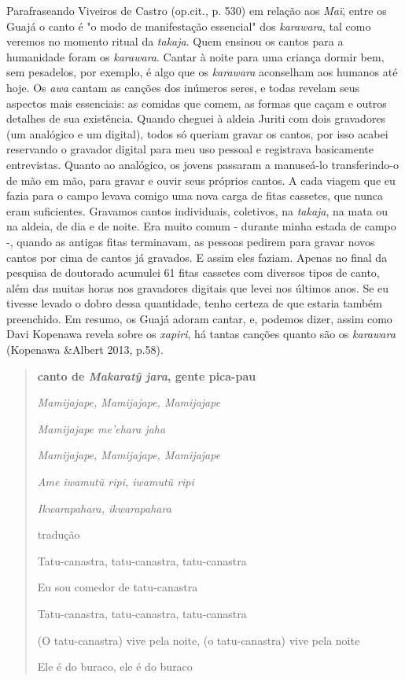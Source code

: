 Parafraseando Viveiros de Castro (op.cit., p. 530) em relação aos
\emph{Maï}, entre os Guajá o canto é "o modo de manifestação essencial"
dos \emph{karawara}, tal como veremos no momento ritual da
\emph{takaja}. Quem ensinou os cantos para a humanidade foram os
\emph{karawara}. Cantar à noite para uma criança dormir bem, sem
pesadelos, por exemplo, é algo que os \emph{karawara} aconselham aos
humanos até hoje. Os \emph{awa} cantam as canções dos inúmeros seres, e
todas revelam seus aspectos mais essenciais: as comidas que comem, as
formas que caçam e outros detalhes de sua existência. Quando cheguei à
aldeia Juriti com dois gravadores (um analógico e um digital), todos só
queriam gravar os cantos, por isso acabei reservando o gravador digital
para meu uso pessoal e registrava basicamente entrevistas. Quanto ao
analógico, os jovens passaram a manuseá-lo transferindo-o de mão em mão,
para gravar e ouvir seus próprios cantos. A cada viagem que eu fazia
para o campo levava comigo uma nova carga de fitas cassetes, que nunca
eram suficientes. Gravamos cantos individuais, coletivos, na
\emph{takaja}, na mata ou na aldeia, de dia e de noite. Era muito comum
- durante minha estada de campo -, quando as antigas fitas terminavam,
as pessoas pedirem para gravar novos cantos por cima de cantos já
gravados. E assim eles faziam. Apenas no final da pesquisa de doutorado
acumulei 61 fitas cassetes com diversos tipos de canto, além das muitas
horas nos gravadores digitais que levei nos últimos anos. Se eu tivesse
levado o dobro dessa quantidade, tenho certeza de que estaria também
preenchido. Em resumo, os Guajá adoram cantar, e, podemos dizer, assim
como Davi Kopenawa revela sobre os \emph{xapiri}, há tantas canções
quanto são os \emph{karawara} (Kopenawa \&Albert 2013, p.58).

\begin{quote}
\textbf{canto de \emph{Makaratỹ jara}, gente pica-pau}

\emph{Mamijajape, Mamijajape, Mamijajape}

\emph{Mamijajape me'ehara jaha}

\emph{Mamijajape, Mamijajape, Mamijajape}

\emph{Ame iwamutũ ripi, iwamutũ ripi }

\emph{Ikwarapahara, ikwarapahara }

tradução

Tatu-canastra, tatu-canastra, tatu-canastra

Eu sou comedor de tatu-canastra

Tatu-canastra, tatu-canastra, tatu-canastra

(O tatu-canastra) vive pela noite, (o tatu-canastra) vive pela noite

Ele é do buraco, ele é do buraco
\end{quote}

